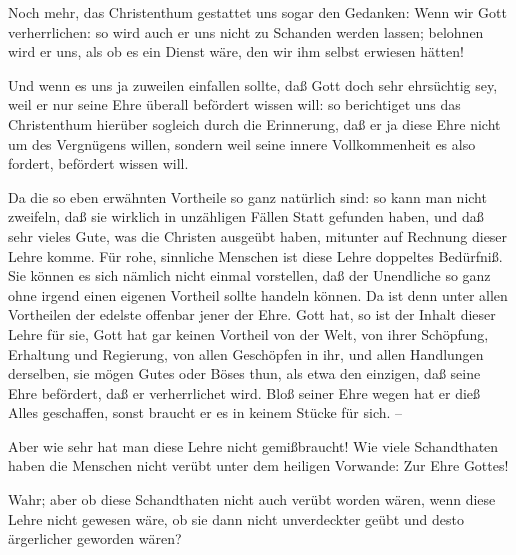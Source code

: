 \begin{aufza}
\item Noch mehr, das Christenthum gestattet uns sogar den Gedanken: Wenn wir Gott verherrlichen: so wird auch er uns nicht zu Schanden werden lassen; belohnen wird er uns, als ob es ein Dienst wäre, den wir ihm selbst erwiesen hätten!
\item Und wenn es uns ja zuweilen einfallen sollte, daß Gott doch sehr ehrsüchtig sey, weil er nur seine Ehre überall befördert wissen will: so berichtiget uns das Christenthum hierüber sogleich durch die Erinnerung, daß er ja diese Ehre nicht um des Vergnügens willen, sondern weil seine innere Vollkommenheit es also fordert, befördert wissen will.
\end{aufza}

Da die so eben erwähnten Vortheile so ganz natürlich sind: so kann man nicht zweifeln, daß sie wirklich in unzähligen Fällen Statt gefunden haben, und daß sehr vieles Gute, was die Christen ausgeübt haben, mitunter auf Rechnung dieser Lehre komme. Für rohe, sinnliche Menschen ist diese Lehre doppeltes Bedürfniß. Sie können es sich nämlich nicht einmal vorstellen, daß der Unendliche so ganz ohne irgend einen eigenen Vortheil sollte handeln können. Da ist denn unter allen Vortheilen der edelste offenbar jener der Ehre. Gott hat, so ist der Inhalt dieser Lehre für sie, Gott hat gar keinen Vortheil von der Welt, von ihrer Schöpfung, Erhaltung und Regierung, von allen Geschöpfen in ihr, und allen Handlungen derselben, sie mögen Gutes oder Böses thun, als etwa den einzigen, daß seine Ehre befördert, daß er verherrlichet wird. Bloß seiner Ehre wegen hat er dieß Alles geschaffen, sonst braucht er es in keinem Stücke für sich. --\par
{} Aber wie sehr hat man diese Lehre nicht gemißbraucht! Wie viele Schandthaten haben die Menschen nicht verübt unter dem heiligen Vorwande: Zur Ehre Gottes!\par
{} Wahr; aber ob diese Schandthaten nicht auch verübt worden wären, wenn diese Lehre nicht gewesen wäre, ob sie dann nicht unverdeckter geübt und desto ärgerlicher geworden wären?

